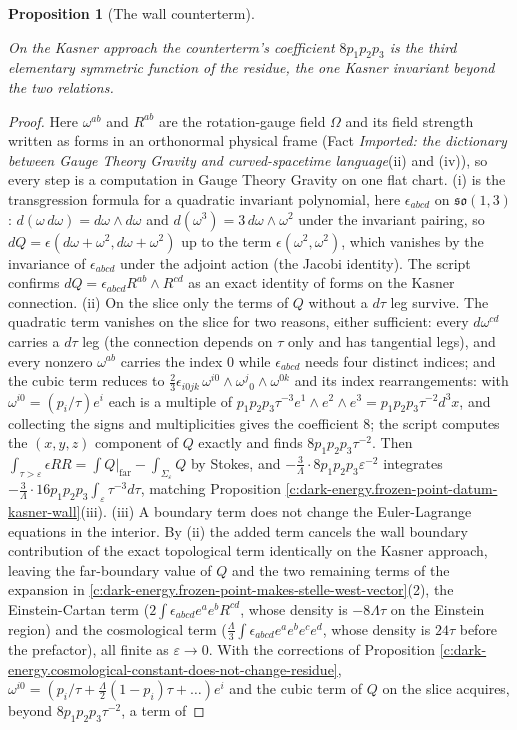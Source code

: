 \documentclass[11pt]{article}
\newtheorem{proposition}[theorem]{Proposition}
\theoremstyle{definition}
\theoremstyle{plain}
\begin{document}
\begin{proposition}[The wall counterterm]
\begin{enumerate}
\end{enumerate}
On the Kasner approach the counterterm's coefficient $8p_1p_2p_3$ is the third elementary symmetric function of the residue, the one Kasner invariant beyond the two relations.
\end{proposition}
\begin{proof}
Here $\omega^{ab}$ and $R^{ab}$ are the rotation-gauge field $\Omega$ and its field strength written as forms in an orthonormal physical frame (Fact \emph{Imported: the dictionary between Gauge Theory Gravity and curved-spacetime language}(ii) and (iv)), so every step is a computation in Gauge Theory Gravity on one flat chart. (i) is the transgression formula for a quadratic invariant polynomial, here $\epsilon_{abcd}$ on $\mathfrak{so}(1,3)$: $d(\omega\,d\omega) = d\omega\wedge d\omega$ and $d(\omega^3) = 3\,d\omega\wedge\omega^2$ under the invariant pairing, so $dQ = \epsilon(d\omega + \omega^2, d\omega + \omega^2)$ up to the term $\epsilon(\omega^2,\omega^2)$, which vanishes by the invariance of $\epsilon_{abcd}$ under the adjoint action (the Jacobi identity). The script confirms $dQ = \epsilon_{abcd}R^{ab}\wedge R^{cd}$ as an exact identity of forms on the Kasner connection. (ii) On the slice only the terms of $Q$ without a $d\tau$ leg survive. The quadratic term vanishes on the slice for two reasons, either sufficient: every $d\omega^{cd}$ carries a $d\tau$ leg (the connection depends on $\tau$ only and has tangential legs), and every nonzero $\omega^{ab}$ carries the index $0$ while $\epsilon_{abcd}$ needs four distinct indices; and the cubic term reduces to $\tfrac23\epsilon_{i0jk}\,\omega^{i0}\wedge\omega^{j}{}_{0}\wedge\omega^{0k}$ and its index rearrangements: with $\omega^{i0} = (p_i/\tau)e^i$ each is a multiple of $p_1p_2p_3\tau^{-3}e^1\wedge e^2\wedge e^3 = p_1p_2p_3\tau^{-2}d^3x$, and collecting the signs and multiplicities gives the coefficient $8$; the script computes the $(x,y,z)$ component of $Q$ exactly and finds $8p_1p_2p_3\tau^{-2}$. Then $\int_{\tau>\varepsilon}\epsilon RR = \int Q\big|_{\text{far}} - \int_{\Sigma_\varepsilon}Q$ by Stokes, and $-\tfrac3\Lambda\cdot 8p_1p_2p_3\varepsilon^{-2}$ integrates $-\tfrac{3}{\Lambda}\cdot 16 p_1p_2p_3\int_\varepsilon\tau^{-3}d\tau$, matching Proposition \ref{c:dark-energy.frozen-point-datum-kasner-wall}(iii). (iii) A boundary term does not change the Euler-Lagrange equations in the interior. By (ii) the added term cancels the wall boundary contribution of the exact topological term identically on the Kasner approach, leaving the far-boundary value of $Q$ and the two remaining terms of the expansion in \ref{c:dark-energy.frozen-point-makes-stelle-west-vector}(2), the Einstein-Cartan term ($2\int\epsilon_{abcd}e^ae^bR^{cd}$, whose density is $-8\Lambda\tau$ on the Einstein region) and the cosmological term ($\tfrac{\Lambda}{3}\int\epsilon_{abcd}e^ae^be^ce^d$, whose density is $24\tau$ before the prefactor), all finite as $\varepsilon\to 0$. With the corrections of Proposition \ref{c:dark-energy.cosmological-constant-does-not-change-residue}, $\omega^{i0} = (p_i/\tau + \tfrac{\Lambda}{2}(1-p_i)\tau + \dots)e^i$ and the cubic term of $Q$ on the slice acquires, beyond $8p_1p_2p_3\tau^{-2}$, a term of 
\end{proof}
\end{document}
